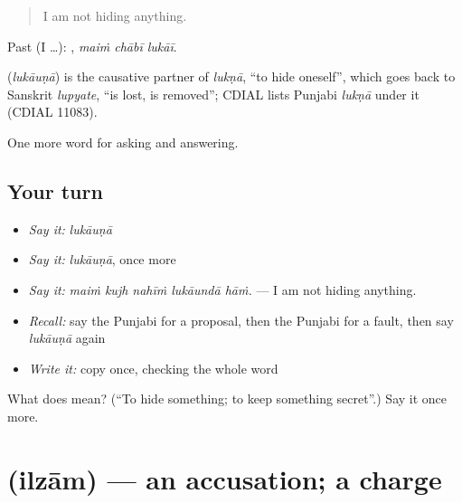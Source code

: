\begin{quote}
I am not hiding anything.
\end{quote}

Past (I …):   , \emph{maiṁ chābī lukāī}.

\begin{cousinweb}
\textbf{} (\emph{lukāuṇā}) is the causative partner of \emph{lukṇā}, \textquotedblleft{}to hide oneself\textquotedblright{}, which goes back to Sanskrit \emph{lupyate}, \textquotedblleft{}is lost, is removed\textquotedblright{}; CDIAL lists Punjabi \emph{lukṇā} under it (CDIAL 11083).
\end{cousinweb}

\begin{grammarlens}[title={What you've built}]
One more word for asking and answering.
\end{grammarlens}

\subsection*{Your turn}
\begin{itemize}
\raggedright
  \item \emph{Say it:} \emph{lukāuṇā}
  \item \emph{Say it:} \emph{lukāuṇā}, once more
  \item \emph{Say it:} \emph{maiṁ kujh nahīṁ lukāundā hāṁ.} — I am not hiding anything.
  \item \emph{Recall:} say the Punjabi for a proposal, then the Punjabi for a fault, then say \emph{lukāuṇā} again
  \item \emph{Write it:} copy \textbf{} once, checking the whole word
\end{itemize}

\begin{tcolorbox}[breakable,colback=teal!4,colframe=teal!35!black,title={Before you move on}]
What does  mean? (\textquotedblleft{}To hide something; to keep something secret\textquotedblright{}.) Say it once more.
\end{tcolorbox}
\section[\texorpdfstring{\pa{ਇਲਜ਼ਾਮ} (ilzām)}{ਇਲਜ਼ਾਮ (ilzām)}]{ (ilzām) — an accusation; a charge}

\label{lesson:PA-C346-ilzam}



